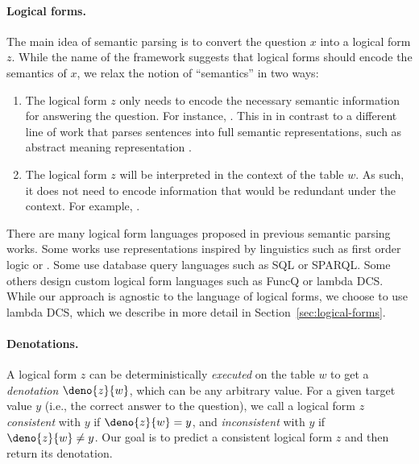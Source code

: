 \paragraph{Logical forms.}
The main idea of semantic parsing
is to convert the question $x$
into a logical form $z$.
While the name of the framework suggests that
logical forms should encode the semantics of $x$,
we relax the notion of ``semantics'' in two ways:
\begin{enumerate}
\item The logical form $z$ only needs to
encode the necessary semantic information
for answering the question.
For instance, .
This in in contrast to a different line of work
that parses sentences into full semantic representations,
such as abstract meaning representation
.
\item The logical form $z$ will be interpreted
in the context of the table $w$.
As such, it does not need to encode information
that would be redundant under the context.
For example, .
\end{enumerate}

There are many logical form languages proposed in
previous semantic parsing works.
Some works use representations inspired by linguistics
such as first order logic or .
Some use database query languages such as
SQL or SPARQL.
Some others design custom logical form languages
such as FuncQ or lambda DCS.
While our approach is agnostic to the language of logical forms,
we choose to use lambda DCS,
which we describe in more detail in Section~\ref{sec:logical-forms}.

\paragraph{Denotations.}
A logical form $z$ can be deterministically \emph{executed}
on the table $w$ to get a \emph{denotation}
$\deno{z}{w}$, which can be any arbitrary value.
For a given target value $y$
(i.e., the correct answer to the question),
we call a logical form $z$ \emph{consistent} with $y$
if $\deno{z}{w} = y$,
and \emph{inconsistent} with $y$ if $\deno{z}{w} \neq y$.
Our goal is to predict a consistent logical form $z$
and then return its denotation.

